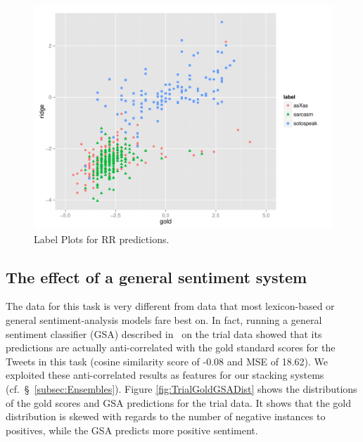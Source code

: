 \documentclass[11pt,letterpaper]{article}
\begin{document}

\begin{figure}[ht!]
    \centering
    \includegraphics[width=1.05\columnwidth]{trialplotv2.pdf}
    \caption{Label Plots for {\sc RR} predictions.}
    \label{fig:LabelPlot.Sarc.soto.asX}
\end{figure}


\subsection*{The effect of a general sentiment system}
The data for this task is very different from data that most lexicon-based or general sentiment-analysis models fare best on. In fact, running a general sentiment classifier (GSA) described in~ on the trial data showed that its predictions are actually anti-correlated with the gold standard scores for the Tweets in this task (cosine similarity score of -0.08 and MSE of
18.62). We exploited these anti-correlated results as features for our stacking systems (cf.\ \S~\ref{subsec:Ensembles}). Figure \ref{fig:TrialGoldGSADist} shows the distributions of the gold scores and GSA predictions for the trial data. It shows that the gold distribution is skewed with regards to the number of negative instances to positives, while the GSA predicts more positive sentiment.
\end{document}
